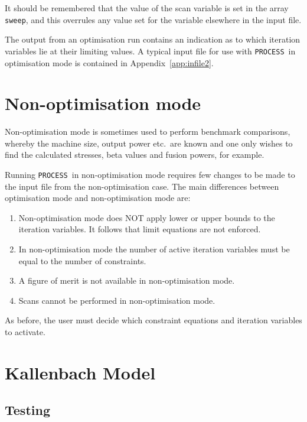 \documentclass[11pt,a4paper]{report}
\newcommand{\process}{\mbox{\texttt{PROCESS}}}
\begin{document}
It should be remembered that the value of the scan variable is set in the
array \texttt{sweep}, and this overrules any value set for the variable
elsewhere in the input file.

The output from an optimisation run contains an indication as to which iteration variables lie at their limiting values. A typical input file for use with \process\ in optimisation mode is contained in Appendix~\ref{app:infile2}.

\section{Non-optimisation mode}
\label{sec:optim}

Non-optimisation mode is sometimes used to perform benchmark comparisons, whereby the
machine size, output power etc.\ are known and one only wishes to find the
calculated stresses, beta values and fusion powers, for example.

Running \process\ in non-optimisation mode requires few changes to be made to the
input file from the non-optimisation case. The main differences between
optimisation mode and non-optimisation mode are:

\begin{enumerate}

\item Non-optimisation mode does NOT apply lower or upper bounds to the iteration
  variables.  It follows that limit equations are not enforced.

\item In non-optimisation mode the number of active iteration variables must be equal to the number of constraints.

\item A figure of merit is not available in non-optimisation mode.

\item Scans cannot be performed in non-optimisation mode.

\end{enumerate}

As before, the user must decide which constraint equations and iteration
variables to activate.

\section{Kallenbach Model}\label{sec:kallenbach}

\subsection{Testing}
\end{document}
